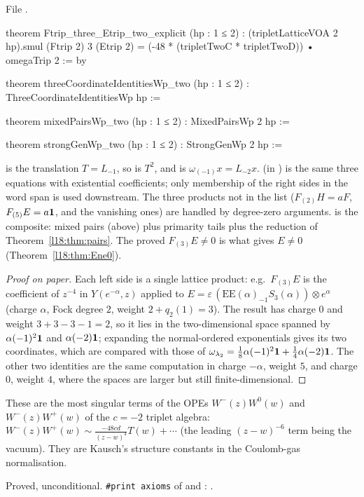 \noindent File .
\begin{leancode}
theorem Ftrip_three_Etrip_two_explicit (hp : 1 ≤ 2) :
    (tripletLatticeVOA 2 hp).smul (Ftrip 2) 3 (Etrip 2) =
      (-48 * (tripletTwoC * tripletTwoD)) • omegaTrip 2 := by

theorem threeCoordinateIdentitiesWp_two (hp : 1 ≤ 2) :
    ThreeCoordinateIdentitiesWp hp :=

theorem mixedPairsWp_two (hp : 1 ≤ 2) : MixedPairsWp 2 hp :=

theorem strongGenWp_two (hp : 1 ≤ 2) : StrongGenWp 2 hp :=
\end{leancode}
\begin{dictionary}
 is the translation $T=L_{-1}$, so  is $T^2$, and
 is $\omega_{(-1)}x=L_{-2}x$.  (in
) is the same three equations with existential coefficients; only
membership of the right sides in the word span is used downstream. The three products not in the list
($F_{(2)}H=aF$, $F_{(5)}E=a\mathbf{1}$, and the vanishing ones) are handled by degree-zero arguments.
 is the composite: mixed pairs (above) plus primarity tails plus the reduction of
Theorem~\ref{l18:thm:pairs}. The proved $F_{(3)}E\ne0$ is what gives $E\ne0$ (Theorem~\ref{l18:thm:Ene0}).
\end{dictionary}
\begin{proof}[Proof on paper]
Each left side is a single lattice product: e.g.\ $F_{(3)}E$ is the coefficient of $z^{-4}$ in
$Y(e^{-\alpha},z)$ applied to $E=\varepsilon\,(\mathrm{EE}(\alpha)_{-1}S_3(\alpha))\otimes e^{\alpha}$ (charge $\alpha$,
Fock degree $2$, weight $2+q_2(1)=3$). The result has charge $0$ and weight $3+3-3-1=2$, so it lies in the
two-dimensional space spanned by $\alpha(-1)^2\mathbf{1}$ and $\alpha(-2)\mathbf{1}$; expanding the normal-ordered
exponentials gives its two coordinates, which are compared with those of
$\omega_{\lambda_2}=\frac18\alpha(-1)^2\mathbf{1}+\frac14\alpha(-2)\mathbf{1}$. The other two identities are the same
computation in charge $-\alpha$, weight $5$, and charge $0$, weight $4$, where the spaces are larger but
still finite-dimensional.
\end{proof}
\begin{physics}
These are the most singular terms of the OPEs $W^-(z)W^0(w)$ and $W^-(z)W^+(w)$ of the $c=-2$
triplet algebra: $W^-(z)W^+(w)\sim\frac{-48cd}{(z-w)^4}T(w)+\cdots$ (the leading $(z-w)^{-6}$
term being the vacuum). They are Kausch's structure constants in the Coulomb-gas normalisation.
\end{physics}
\begin{status}
Proved, unconditional. \texttt{\#print axioms} of  and
: .
\end{status}

